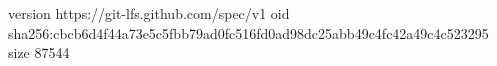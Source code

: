 version https://git-lfs.github.com/spec/v1
oid sha256:cbcb6d4f44a73e5c5fbb79ad0fc516fd0ad98dc25abb49c4fc42a49c4c523295
size 87544
